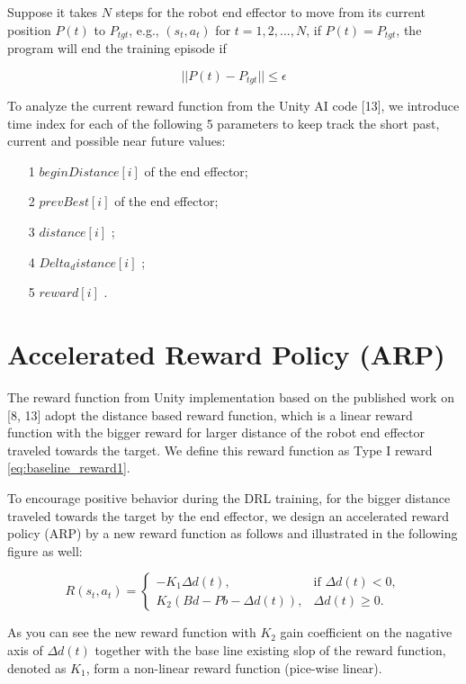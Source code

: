 \documentclass[conference]{IEEEtran}
\begin{document}
Suppose it takes $N$ steps for the 
robot end effector to move from 
its current position $P(t)$ to $P_{tgt}$, e.g., 
$(s_t, a_t)$ for $t=1,2, ..., N$, if 
$P(t) = P_{tgt}$, the program will end the training episode
if

\begin{equation}
|| P(t) - P_{tgt} || \leq \epsilon
\end{equation} 

 
To analyze the current reward function from the 
Unity AI code [13], we introduce time index for 
each of the following 5 parameters to keep track 
the short past, current and possible near future
values:   
 
\begin{itemize}
\item[1] $beginDistance[i]$ of the end effector; 	
\item[2] $prevBest[i]$ of the end effector; 
\item[3] $distance[i]$ ; 
\item[4] $Delta_distance[i]$ ;	
\item[5] $reward[i]$ . 
\end{itemize}

\section{Accelerated Reward Policy (ARP)}
The reward function from Unity implementation based on the 
published work on [8, 13] 
adopt the distance based reward function, which is a linear 
reward function with the bigger reward for larger distance 
of the robot end effector traveled towards the target. 
We define this reward function as Type I reward \ref{eq:baseline_reward1}. 

To encourage positive behavior during the DRL training, 
for the bigger distance traveled towards the target by
the end effector, we design an
accelerated reward policy (ARP) by 
a new reward function as follows and illustrated in the 
following figure as well:    

\begin{equation}
R(s_t,a_t) =
\begin{cases}
    - K_1 \Delta d (t), & \text{if $\Delta d (t)<0$},\\
    K_2 (Bd - Pb - \Delta d(t)), & \text{$\Delta d (t)\geq 0$}.
\end{cases}
\label{eq:baseline_reward1}
\end{equation}

As you can see the new reward function
with $K_2$ gain coefficient on the nagative 
axis of $\Delta d(t)$ together with the base line 
existing slop of the reward function, denoted as $K_1$,
form a non-linear reward function (pice-wise linear).   
\end{document}
